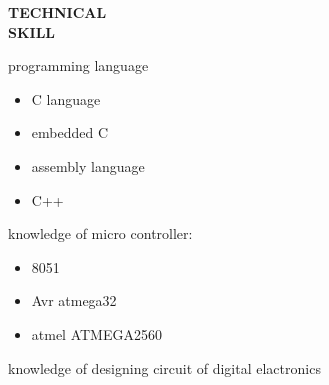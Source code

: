\documentclass{article}
\begin{document}
  \begin{flushleft}
  	\vspace{0.4in}
  	\textbf{TECHNICAL  \\ SKILL}
  	\begin{itemize}
  		\vspace{-0.45in}
  		\addtolength{\itemindent}{1.359in}
  		
  		\item  programming language
  		{\begin{itemize}
  				\addtolength{\itemindent}{1.359in}
  				\item C language
  				\item embedded C
  				\item assembly language
  				\item C++
  				
  			\end{itemize}
  		}  
  		\item knowledge of  micro controller:
  		{\begin{itemize}
  				\addtolength{\itemindent}{1.359in}
  				\item 8051 
  				\item Avr atmega32
  				\item atmel ATMEGA2560
  				
  			\end{itemize}
  			\item knowledge of designing circuit of digital elactronics 
  		}  
  		
  	\end{itemize}
  \end{flushleft}
\end{document}
